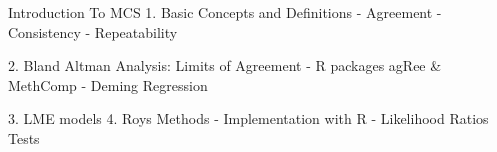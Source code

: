 Introduction To MCS
1. Basic Concepts and Definitions
- Agreement
- Consistency 
- Repeatability

2. Bland Altman Analysis: Limits of Agreement
- R packages agRee & MethComp
- Deming Regression

3. LME models
4. Roys Methods
- Implementation with R
- Likelihood Ratios Tests




